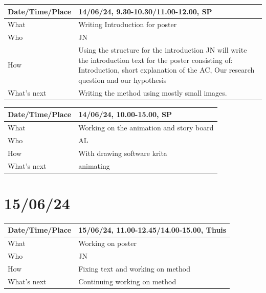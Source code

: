 \documentclass{article}
\begin{document}
\begin{table}[H]
\begin{tabular}{|p{1.5in}|p{4in}|}
\hline
Date/Time/Place & 14/06/24, 9.30-10.30/11.00-12.00, SP \\ \hline
What            & Writing Introduction for poster \\ \hline
Who             & JN \\ \hline
How             & Using the structure for the introduction JN will write the introduction text for the poster consisting of: Introduction, short explanation of the AC, Our research question and our hypothesis \\ \hline
What's next     & Writing the method using mostly small images. \\ \hline
\end{tabular}
\end{table}

\begin{table}[H]
\begin{tabular}{|p{1.5in}|p{4in}|}
\hline
Date/Time/Place & 14/06/24, 10.00-15.00, SP \\ \hline
What            &  Working on the animation and story board\\ \hline
Who             & AL \\ \hline
How             & With drawing software krita  \\ \hline
What's next     &  animating\\ \hline
\end{tabular}
\end{table}

\section{15/06/24}

\begin{table}[H]
\begin{tabular}{|p{1.5in}|p{4in}|}
\hline
Date/Time/Place & 15/06/24, 11.00-12.45/14.00-15.00, Thuis \\ \hline
What            & Working on poster \\ \hline
Who             & JN \\ \hline
How             & Fixing text and working on method \\ \hline
What's next     & Continuing working on method \\ \hline
\end{tabular}
\end{table}
\end{document}

